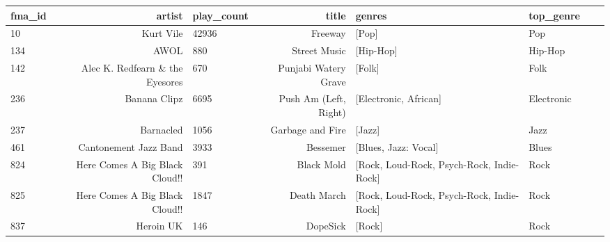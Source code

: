 \documentclass{article}
\begin{document}
\begin{table}
	\tiny
	\centering
	\begin{tabular}{lrlrllll}
	\toprule
	 fma\_id &                                             artist &  play\_count &                                              title &                                             genres &            top\_genre  \\
	 \toprule
		10 &                                          Kurt Vile &       42936 &                                            Freeway &                                              [Pop] &                  Pop  \\
		134 &                                               AWOL &         880 &                                       Street Music &                                          [Hip-Hop] &              Hip-Hop  \\
		 142 &                    Alec K. Redfearn \& the Eyesores &         670 &                               Punjabi Watery Grave &                                             [Folk] &                 Folk  \\
		 236 &                                       Banana Clipz &        6695 &                              Push Am (Left, Right) &                              [Electronic, African] &           Electronic  \\
		 237 &                                          Barnacled &        1056 &                    Garbage and Fire &                                             [Jazz] &                 Jazz  \\
		 461 &                              Cantonement Jazz Band &        3933 &                                           Bessemer &                               [Blues, Jazz: Vocal] &                Blues  \\
		824 &                     Here Comes A Big Black Cloud!! &         391 &                                         Black Mold &          [Rock, Loud-Rock, Psych-Rock, Indie-Rock] &                 Rock  \\
		 825 &                     Here Comes A Big Black Cloud!! &        1847 &                                        Death March &          [Rock, Loud-Rock, Psych-Rock, Indie-Rock] &                 Rock  \\
		837 &                                          Heroin UK &         146 &                                           DopeSick &                                             [Rock] &                 Rock \\

\end{tabular}
\end{table}
\end{document}
